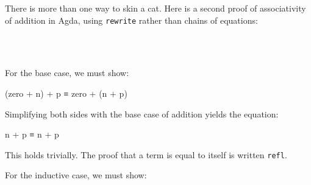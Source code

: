 There is more than one way to skin a cat. Here is a second proof of
associativity of addition in Agda, using \texttt{rewrite} rather than
chains of equations:

\begin{fence}
\begin{code}%
\>[0]\AgdaSpace{}%
\AgdaSymbol{:}\AgdaSpace{}%
\AgdaSpace{}%
\AgdaSymbol{(}\AgdaSpace{}%
\AgdaSpace{}%
\AgdaSpace{}%
\AgdaSymbol{:}\AgdaSpace{}%
\AgdaSymbol{)}\AgdaSpace{}%
\AgdaSpace{}%
\AgdaSymbol{(}\AgdaSpace{}%
\AgdaOperator{\AgdaPrimitive{+}}\AgdaSpace{}%
\AgdaSymbol{)}\AgdaSpace{}%
\AgdaOperator{\AgdaPrimitive{+}}\AgdaSpace{}%
\AgdaSpace{}%
\AgdaSpace{}%
\AgdaSpace{}%
\AgdaOperator{\AgdaPrimitive{+}}\AgdaSpace{}%
\AgdaSymbol{(}\AgdaSpace{}%
\AgdaOperator{\AgdaPrimitive{+}}\AgdaSpace{}%
\AgdaSymbol{)}\<%
\\
\>[0]\AgdaSpace{}%
%
\>[17]\AgdaSpace{}%
%
\>[46]\AgdaSymbol{=}%
\>[49]\<%
\\
\>[0]\AgdaSpace{}%
\AgdaSymbol{(}\AgdaSpace{}%
\AgdaSymbol{)}\AgdaSpace{}%
\AgdaSpace{}%
%
\>[22]\AgdaSpace{}%
\AgdaSpace{}%
\AgdaSpace{}%
\AgdaSpace{}%
%
\>[46]\AgdaSymbol{=}%
\>[49]\<%
\end{code}
\end{fence}

For the base case, we must show:

\begin{myDisplay}
(zero + n) + p ≡ zero + (n + p)
\end{myDisplay}

Simplifying both sides with the base case of addition yields the
equation:

\begin{myDisplay}
n + p ≡ n + p
\end{myDisplay}

This holds trivially. The proof that a term is equal to itself is
written \texttt{refl}.

For the inductive case, we must show:

